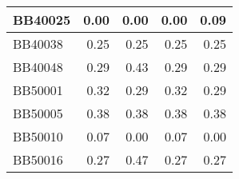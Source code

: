 \begin{table}[htbp]
\begin{tabular}{|l|r|r|r|r|}
		\hline
		BB40025 & \cellcolor[rgb]{ .384,  .745,  .478}0.00 & \cellcolor[rgb]{ .384,  .745,  .478}0.00 & \cellcolor[rgb]{ .384,  .745,  .478}0.00 & \cellcolor[rgb]{ .988,  1,  .992}0.09 \\
		\hline
		BB40038 & \cellcolor[rgb]{ .988,  1,  .992}0.25 & \cellcolor[rgb]{ .988,  1,  .992}0.25 & \cellcolor[rgb]{ .988,  1,  .992}0.25 & \cellcolor[rgb]{ .988,  1,  .992}0.25 \\
		\hline
		BB40048 & \cellcolor[rgb]{ .384,  .745,  .478}0.29 & \cellcolor[rgb]{ .988,  1,  .992}0.43 & \cellcolor[rgb]{ .384,  .745,  .478}0.29 & \cellcolor[rgb]{ .384,  .745,  .478}0.29 \\
		\hline
		BB50001 & \cellcolor[rgb]{ .988,  1,  .992}0.32 & \cellcolor[rgb]{ .384,  .745,  .478}0.29 & \cellcolor[rgb]{ .988,  1,  .992}0.32 & \cellcolor[rgb]{ .384,  .745,  .478}0.29 \\
		\hline
		BB50005 & \cellcolor[rgb]{ .988,  1,  .992}0.38 & \cellcolor[rgb]{ .988,  1,  .992}0.38 & \cellcolor[rgb]{ .988,  1,  .992}0.38 & \cellcolor[rgb]{ .988,  1,  .992}0.38 \\
		\hline
		BB50010 & \cellcolor[rgb]{ .988,  1,  .992}0.07 & \cellcolor[rgb]{ .384,  .745,  .478}0.00 & \cellcolor[rgb]{ .988,  1,  .992}0.07 & \cellcolor[rgb]{ .384,  .745,  .478}0.00 \\
		\hline
		BB50016 & \cellcolor[rgb]{ .384,  .745,  .478}0.27 & \cellcolor[rgb]{ .988,  1,  .992}0.47 & \cellcolor[rgb]{ .384,  .745,  .478}0.27 & \cellcolor[rgb]{ .384,  .745,  .478}0.27 \\
		\hline		
	\end{tabular}%
	\label{tab:pasta-variants-a}%
\end{table}%



